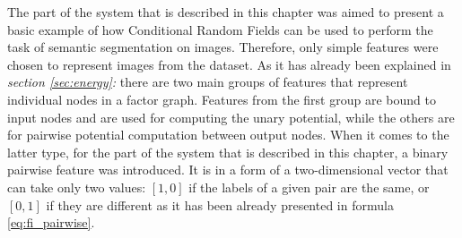 The part of the system that is described in this chapter was aimed to present a basic example of how Conditional Random Fields can be used to perform the task of semantic segmentation on images. Therefore, only simple features were chosen to represent images from the dataset. As it has already been explained in \textit{section \ref{sec:energy}: } there are two main groups of features that represent individual nodes in a factor graph. Features from the first group are bound to input nodes and are used for computing the unary potential, while the others are for pairwise potential computation between output nodes. When it comes to the latter type, for the part of the system that is described in this chapter, a binary pairwise feature was introduced. It is in a form of a two-dimensional vector that can take only two values: $[1,0]$ if the labels of a given pair are the same, or $[0,1]$ if they are different as it has been already presented in formula \ref{eq:fi_pairwise}. 

